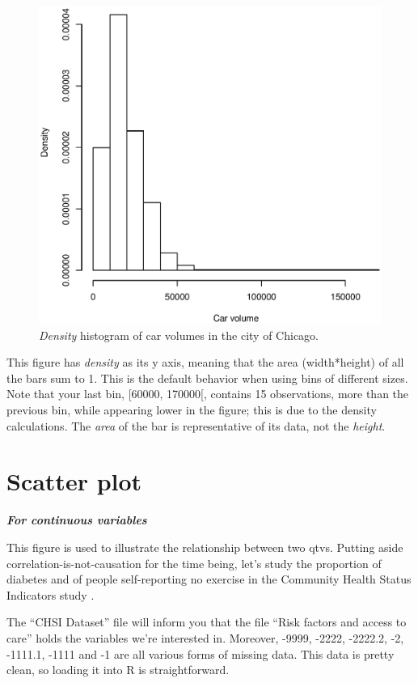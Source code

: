 \documentclass{report}
\newcommand{\notefor}[1]{\hfill\textbf{\textit{#1}}}
\begin{document}
	\begin{figure}[h]
		\centering
		\includegraphics[width=1.0\textwidth]{histd.eps}
		\caption{\emph{Density} histogram of car volumes in the city of Chicago.}
		\label{fig:histd}
	\end{figure}

	This figure has \emph{density} as its y axis, meaning that the area (width*height) of all the bars sum to 1. This is the default behavior when using bins of different sizes. Note that your last bin, [60000, 170000[, contains 15 observations, more than the previous bin, while appearing lower in the figure; this is due to the density calculations. The \emph{area} of the bar is representative of its data, not the \emph{height}.
	
	\section{Scatter plot}
	\notefor{For continuous variables}
	
	This figure is used to illustrate the relationship between two \glspl{qtv}. Putting aside correlation-is-not-causation for the time being, let's study the proportion of diabetes and of people self-reporting no exercise in the Community Health Status Indicators study \cite{chsi}.
	
	The ``CHSI Dataset'' file will inform you that the file ``Risk factors and access to care'' holds the variables we're interested in. Moreover, -9999, -2222, -2222.2, -2, -1111.1, -1111 and -1 are all various forms of missing data. This data is pretty clean, so loading it into R is straightforward.
	
\end{document}
